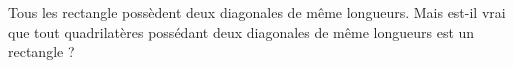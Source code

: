
\begin{exercice}\label{exosmath-0862}

    Tous les rectangle possèdent deux diagonales de même longueurs. Mais est-il vrai que tout quadrilatères possédant deux diagonales de même longueurs est un rectangle ?

\end{exercice}
